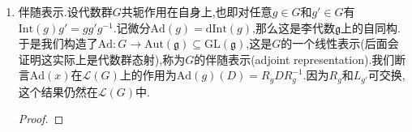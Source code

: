 \begin{enumerate}
\begin{proof}
	    \begin{align*}
	    	\varphi^*(D_{\mathrm{d}\varphi_e(v)}f')(g_1)&=D_{\mathrm{d}\varphi_e(v)}f'(\varphi(g_1))\\&=\mathrm{d}\varphi_e(v)(L_{\varphi(g_1^{-1})}f')\\&=v(\varphi^*L_{\varphi(g_1^{-1})}f')\\&=v(L_{g_1^{-1}}\varphi^*f')\\&=D_v(\varphi^*f')(g_1)
	    \end{align*}
	    其中倒数第二个等号是因为,对任意$g_2\in G$有:
	    \begin{align*}
	    	\varphi^*L_{\varphi(g_1^{-1})}f'(g_2)&=L_{\varphi(g_1^{-1})}f'(\varphi(g_2))\\&=f'(\varphi(g_1g_2))\\&=\varphi^*f'(g_1g_2)\\&=L_{g_1^{-1}}\varphi^*f'(g_2)
	    \end{align*}
	\end{proof}
    \item 伴随表示.设代数群$G$共轭作用在自身上,也即对任意$g\in G$和$g'\in G$有$\mathrm{Int}(g)g'=gg'g^{-1}$.记微分$\mathrm{Ad}(g)=\mathrm{d}\mathrm{Int}(g)$,那么这是李代数$\mathfrak{g}$上的自同构.于是我们构造了$\mathrm{Ad}:G\to\mathrm{Aut}(\mathfrak{g})\subseteq\mathrm{GL}(\mathfrak{g})$,这是$G$的一个线性表示(后面会证明这实际上是代数群态射),称为$G$的伴随表示(adjoint representation).我们断言$\mathrm{Ad}(x)$在$\mathscr{L}(G)$上的作用为$\mathrm{Ad}(g)(D)=R_gDR_g^{-1}$.因为$R_g$和$L_{g'}$可交换,这个结果仍然在$\mathscr{L}(G)$中.
    \begin{proof}
    	

\end{proof}
\end{enumerate}
